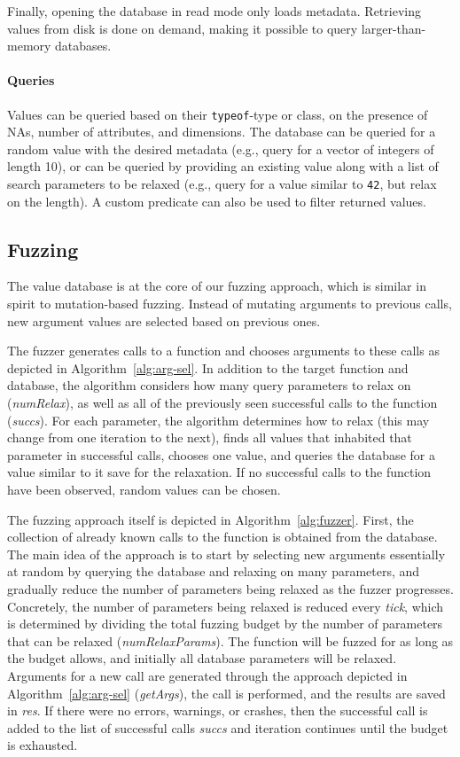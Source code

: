 \documentclass[sigplan,nonacm,anonymous,review]{acmart}
\begin{document}
Finally, opening the database in {read mode} only loads metadata.
Retrieving values from disk is done on demand, making it possible to
query larger-than-memory databases.

\paragraph{Queries}

Values can be queried based on their {\tt typeof}-type or class, on
the presence of NAs, number of attributes, and dimensions.  The database
can be queried for a random value with the desired metadata (e.g., query for a
vector of integers of length 10), or can be queried by providing an
existing value along with a list of search parameters to be relaxed
(e.g., query for a value similar to {\tt 42}, but relax
on the length).  A custom predicate can also be used to filter
returned values.

\subsection{Fuzzing}

The value database is at the core of our fuzzing approach, which is
similar in spirit to mutation-based fuzzing. Instead of mutating
arguments to previous calls, new argument values are selected based on
previous ones.

The fuzzer generates calls to a function and chooses arguments to these
calls as depicted in Algorithm~\ref{alg:arg-sel}.  In addition to the
target function and database, the algorithm considers how many query
parameters to relax on (\emph{numRelax}), as well as all of the
previously seen successful calls to the function (\emph{succs}).
For each parameter, the algorithm determines how to relax (this may
change from one iteration to the next), finds all values that
inhabited that parameter in successful calls, chooses one value, and
queries the database for a value similar to it save for the
relaxation.  If no successful calls to the function have been
observed, random values can be chosen.

The fuzzing approach itself is depicted in Algorithm~\ref{alg:fuzzer}.
First, the collection of already known calls to the function is obtained
from the database.  The main idea of the approach is to start by
selecting new arguments essentially at random by querying the database
and relaxing on many parameters, and gradually reduce the number of
parameters being relaxed as the fuzzer progresses.  Concretely, the
number of parameters being relaxed is reduced every \emph{tick},
which is determined by dividing the total fuzzing budget by the number
of parameters that can be relaxed (\emph{numRelaxParams}).  The
function will be fuzzed for as long as the budget allows, and
initially all database parameters will be relaxed.  Arguments for a
new call are generated through the approach depicted in
Algorithm~\ref{alg:arg-sel} (\emph{getArgs}), the call is performed,
and the results are saved in \emph{res}.  If there were no errors,
warnings, or crashes, then the successful call is added to the list of
successful calls \emph{succs} and iteration continues until the
budget is exhausted.
\end{document}
